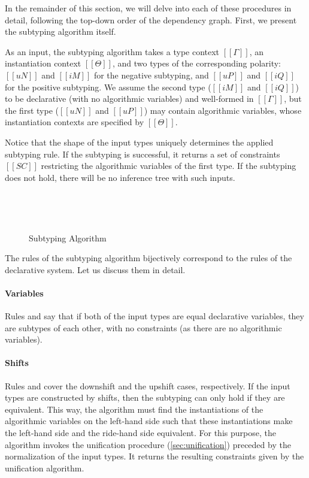 In the remainder of this section, we will delve into each of these procedures in
detail, following the top-down order of the dependency graph. First, 
we present the subtyping algorithm itself.

As an input, the subtyping algorithm takes
a type context $[[Γ]]$, an instantiation context $[[Θ]]$,
and two types of the corresponding polarity:
$[[uN]]$ and  $[[iM]]$ for the negative subtyping, and
$[[uP]]$ and  $[[iQ]]$ for the positive subtyping.
We assume the second type ($[[iM]]$ and $[[iQ]]$) to be 
declarative (with no algorithmic variables) and well-formed in $[[Γ]]$,
but the first type ($[[uN]]$ and $[[uP]]$) may contain algorithmic variables,
whose instantiation contexts are specified by $[[Θ]]$.

Notice that the shape of the input types uniquely determines the
applied subtyping rule.  If the subtyping is successful, it returns
a set of constraints $[[SC]]$ restricting the algorithmic 
variables of the first type. If the subtyping does not hold, 
there will be no inference tree with such inputs. 

\begin{figure}[h]
  \hfill\\
  \begin{multicols}{2}
    \ottdefnANsubLabeled{}
    \columnbreak\\
    \ottdefnAPsupLabeled{}
  \end{multicols}
  \caption{Subtyping Algorithm}
  \label{fig:alg-subtyping}
\end{figure}

The rules of the subtyping algorithm bijectively correspond to the rules of the declarative
system. Let us discuss them in detail.

\paragraph*{Variables} Rules  and 
say that if both of the input types are equal declarative variables,
they are subtypes of each other, with no constraints (as there are no algorithmic variables).

\paragraph*{Shifts} Rules  and
 cover the downshift and the upshift cases,
respectively. If the input types are constructed by shifts, then the subtyping
can only hold if they are equivalent. This way, the algorithm must find the
instantiations of the algorithmic variables on the left-hand side
such that these instantiations make the left-hand side and the ride-hand side
equivalent. For this purpose, the algorithm invokes the
unification procedure (\cref{sec:unification}) preceded by the normalization of the input types.
It returns the resulting constraints given by the unification algorithm. 

